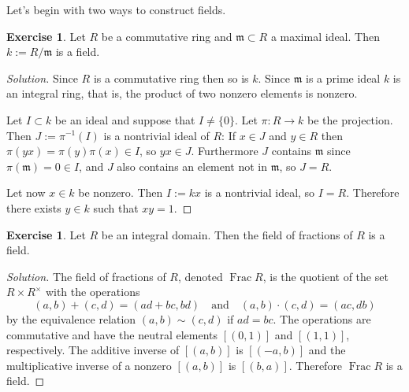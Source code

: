 \documentclass[11pt]{amsart}
\theoremstyle{definition}
\newtheorem{e}[theo]{Exercise}
\newenvironment{s}{\begin{proof}[Solution]}{\end{proof}}
\DeclareMathOperator{\Frac}{Frac}
\begin{document}
Let's begin with two ways to construct fields.

\begin{e}
Let $R$ be a commutative ring and $\mathfrak m \subset R$ a maximal ideal.
Then $k := R / \mathfrak m$ is a field.
\end{e}

\begin{s}
Since $R$ is a commutative ring then so is $k$.
Since $\mathfrak m$ is a prime ideal $k$ is an integral ring, that is, the product of two nonzero elements is nonzero.

Let $I \subset k$ be an ideal and suppose that $I \not= \{0\}$.
Let $\pi : R \to k$ be the projection.
Then $J := \pi^{-1}(I)$ is a nontrivial ideal of $R$:
If $x \in J$ and $y \in R$ then $\pi(yx) = \pi(y) \pi(x) \in I$, so $yx \in J$.
Furthermore $J$ contains $\mathfrak m$ since $\pi(\mathfrak m) = 0 \in I$, and $J$ also contains an element not in $\mathfrak m$, so $J = R$.

Let now $x \in k$ be nonzero.
Then $I := k x$ is a nontrivial ideal, so $I = R$.
Therefore there exists $y \in k$ such that $xy = 1$.
\end{s}

\begin{e}
Let $R$ be an integral domain.
Then the field of fractions of $R$ is a field.
\end{e}

\begin{s}
The field of fractions of $R$, denoted $\Frac R$, is the quotient of the set
\(
R \times R^\times
\)
with the operations
\[
(a,b) + (c,d) = (ad + bc, bd)
\quad\text{and}\quad
(a,b) \cdot (c,d) = (ac, db)
\]
by the equivalence relation $(a,b) \sim (c,d)$ if $ad = bc$.
The operations are commutative and have the neutral elements $[(0,1)]$ and $[(1,1)]$, respectively.
The additive inverse of $[(a,b)]$ is $[(-a,b)]$ and the multiplicative inverse of a nonzero $[(a,b)]$ is $[(b,a)]$.
Therefore $\Frac R$ is a field.
\end{s}
\end{document}
